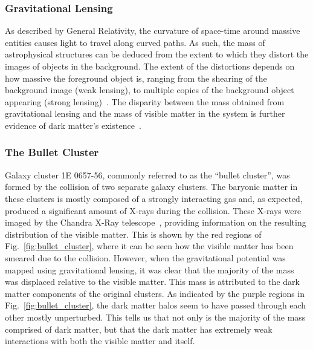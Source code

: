 \subsubsection*{Gravitational Lensing}

As described by General Relativity, the curvature of space-time around massive entities causes light to travel along curved paths. 
As such, the mass of astrophysical structures can be deduced from the extent to which they distort the images of objects in the background. The extent of the distortions depends on how massive the foreground object is, ranging from the shearing of the background image (weak lensing), to multiple copies of the background object appearing (strong lensing)~\cite{Schneider_Gravitationallensingstrong}.  The disparity between the mass obtained from gravitational lensing and the mass of visible matter in the system is further evidence of dark matter's existence~\cite{SDSS:2005sxd_FourthDataRelease, Mandelbaum:2005nx_Galaxyhalomasses}. 

\subsubsection*{The Bullet Cluster}
Galaxy cluster 1E 0657-56, commonly referred to as the ``bullet cluster'', was formed by the collision of two separate galaxy clusters. 
The baryonic matter in these clusters is mostly composed of a strongly interacting gas and, as expected, produced a significant amount of X-rays during the collision. These X-rays were imaged by the Chandra X-Ray telescope~\cite{Clowe:2003tk_Weaklensingmass}, providing information on the resulting distribution of the visible matter. This is shown by the red regions of Fig.~\ref{fig:bullet_cluster}, where it can be seen how the visible matter has been smeared due to the collision. 
However, when the gravitational potential was mapped using gravitational lensing, it was clear that the majority of the mass was displaced relative to the visible matter. This mass is attributed to the dark matter components of the original clusters. As indicated by the purple regions in Fig.~\ref{fig:bullet_cluster}, the dark matter halos seem to have passed through each other mostly unperturbed. This tells us that not only is the majority of the mass comprised of dark matter, but that the dark matter has extremely weak interactions with both the visible matter and itself. 

